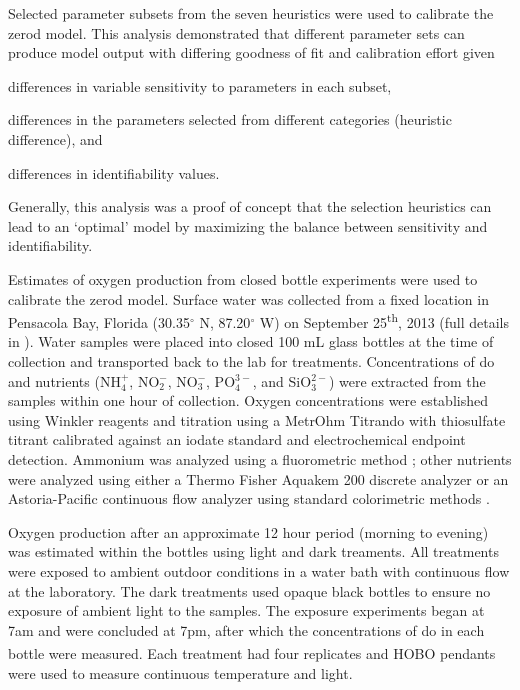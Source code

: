\documentclass[review]{elsarticle}\usepackage[]{graphicx}\usepackage[]{color}
\begin{document}
Selected parameter subsets from the seven heuristics were used to calibrate the \ac{zerod} model.  This analysis demonstrated that different parameter sets can produce model output with differing goodness of fit and calibration effort given
\begin{inparaenum}[1\upshape)]
\item differences in variable sensitivity to parameters in each subset, 
\item differences in the parameters selected from different categories (heuristic difference), and 
\item differences in identifiability values.
\end{inparaenum}
Generally, this analysis was a proof of concept that the selection heuristics can lead to an `optimal' model by maximizing the balance between sensitivity and identifiability.  

Estimates of oxygen production from closed bottle experiments were used to calibrate the \ac{zerod} model.  Surface water was collected from a fixed location in Pensacola Bay, Florida (30.35$^{\circ}$ N, 87.20$^{\circ}$ W) on September 25\textsuperscript{th}, 2013 (full details in ).  Water samples were placed into closed 100 mL glass bottles at the time of collection and transported back to the lab for treatments.  Concentrations of \ac{do} and nutrients (NH$_4^+$, NO$_2^-$, NO$_3^-$, PO$_4^{3-}$, and SiO$_3^{2-}$) were extracted from the samples within one hour of collection. Oxygen concentrations were established using Winkler reagents \citep{Parsons85} and titration using a MetrOhm Titrando with thiosulfate titrant calibrated against an iodate standard and electrochemical endpoint detection.  Ammonium was analyzed using a fluorometric method \citep{Holmes99}; other nutrients were analyzed using either a Thermo Fisher Aquakem 200 discrete analyzer or an Astoria-Pacific continuous flow analyzer using standard colorimetric methods .

Oxygen production after an approximate 12 hour period (morning to evening) was estimated within the bottles using light and dark treaments.  All treatments were exposed to ambient outdoor conditions in a water bath with continuous flow at the laboratory.  The dark treatments used opaque black bottles to ensure no exposure of ambient light to the samples.  The exposure experiments began at 7am and were concluded at 7pm, after which the concentrations of \ac{do} in each bottle were measured.  Each treatment had four replicates and HOBO\textsuperscript{\textregistered} pendants were used to measure continuous temperature and light.  
\end{document}
